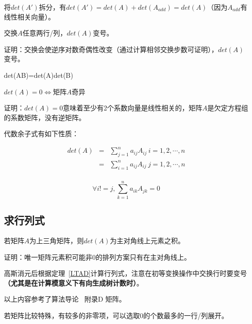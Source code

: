 将$det(A')$拆分，有$det(A')=det(A)+det(A_{add})=det(A)$（因为$A_{add}$有线性相关向量）。
\begin{property}
	交换$A$任意两行/列，$det(A)$变号。
\end{property}

证明：交换会使逆序对数奇偶性改变（通过计算相邻交换步数可证明），$det(A)$变号。
\begin{property}
	det(AB)=det(A)det(B)
\end{property}
\begin{theorem}
	$det(A)=0\Leftrightarrow$矩阵$A$奇异
\end{theorem}

证明：$det(A)=0$意味着至少有2个系数向量是线性相关的，矩阵$A$是欠定方程组的系数矩阵，没有逆矩阵。

代数余子式有如下性质：
\begin{property}
    \begin{eqnarray*}
        det(A)&=&\sum_{j=1}^n{a_{ij}A_{ij}} ~i=1,2,\cdots,n\\
        &=&\sum_{i=1}^n{a_{ij}A_{ij}} ~j=1,2,\cdots,n\\
    \end{eqnarray*}
\end{property}
\begin{property}
    \begin{displaymath}
        \forall i!=j,\sum_{k=1}^n{a_{ik}A_{jk}}=0
    \end{displaymath}
\end{property}
\subsection{求行列式}
\begin{theorem}\label{LTAD}
	若矩阵$A$为上三角矩阵，则$det(A)$为主对角线上元素之积。
\end{theorem}

证明：唯一矩阵元素积可能非0的排列方案只有在主对角线上。

高斯消元后根据定理~\ref{LTAD}计算行列式，注意在初等变换操作中交换行时要变号
{\bfseries （尤其是在计算模意义下有向生成树计数时）}。

以上内容参考了算法导论~\cite{ITA3} 附录D 矩阵。

若矩阵比较特殊，有较多的非零项，可以选取0的个数最多的一行/列展开。
